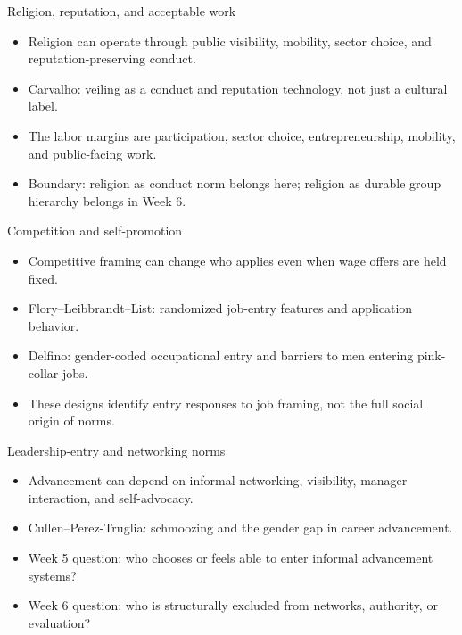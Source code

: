 \documentclass[aspectratio=169,11pt]{beamer}
\begin{document}
\begin{frame}{Religion, reputation, and acceptable work}
\begin{itemize}
    \item Religion can operate through public visibility, mobility, sector choice, and reputation-preserving conduct.
    \item Carvalho: veiling as a conduct and reputation technology, not just a cultural label.
    \item The labor margins are participation, sector choice, entrepreneurship, mobility, and public-facing work.
    \item Boundary: religion as conduct norm belongs here; religion as durable group hierarchy belongs in Week 6.
\end{itemize}
\end{frame}

\begin{frame}{Competition and self-promotion}
\begin{itemize}
    \item Competitive framing can change who applies even when wage offers are held fixed.
    \item Flory--Leibbrandt--List: randomized job-entry features and application behavior.
    \item Delfino: gender-coded occupational entry and barriers to men entering pink-collar jobs.
    \item These designs identify entry responses to job framing, not the full social origin of norms.
\end{itemize}
\end{frame}

\begin{frame}{Leadership-entry and networking norms}
\begin{itemize}
    \item Advancement can depend on informal networking, visibility, manager interaction, and self-advocacy.
    \item Cullen--Perez-Truglia: schmoozing and the gender gap in career advancement.
    \item Week 5 question: who chooses or feels able to enter informal advancement systems?
    \item Week 6 question: who is structurally excluded from networks, authority, or evaluation?
\end{itemize}
\end{frame}
\end{document}
